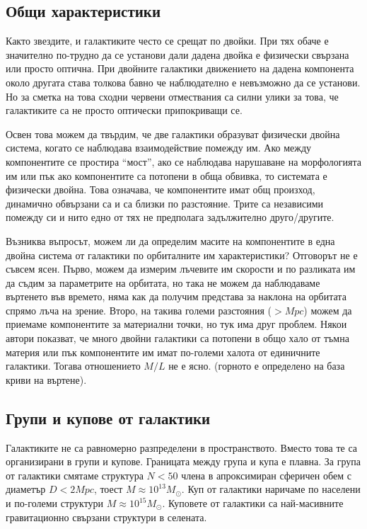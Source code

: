 \documentclass[a4paper,12pt]{article}
\begin{document}
\subsection{Общи характеристики}

 Както звездите, и галактиките често се срещат по двойки. При тях обаче е значително по-трудно да се установи дали дадена двойка е физически свързана или просто оптична. При двойните галактики движението на дадена компонента около другата става толкова бавно че наблюдателно е невъзможно да се установи. Но за сметка на това сходни червени отмествания са силни улики за това, че галактиките са не просто оптически припокриващи се.

 Освен това можем да твърдим, че две галактики образуват физически двойна система, когато се наблюдава взаимодействие помежду им. Ако между компонентите се простира ``мост'', ако се наблюдава нарушаване на морфологията им или пък ако компонентите са потопени в обща обвивка, то системата е физически двойна. Това означава, че компонентите имат общ произход, динамично обвързани са и са близки по разстояние. Трите са независими помежду си и нито едно от тях не предполага задължително друго/другите.

 Възниква въпросът, можем ли да определим масите на компонентите в една двойна система от галактики по орбиталните им характеристики? Отговорът не е съвсем ясен. Първо, можем да измерим лъчевите им скорости и по разликата им да съдим за параметрите на орбитата, но така не можем да наблюдаваме въртенето във времето, няма как да получим представа за наклона на орбитата спрямо лъча на зрение. Второ, на такива големи разстояния ($>Mpc$) можем да приемаме компонентите за материални точки, но тук има друг проблем. Някои автори показват, че много двойни галактики са потопени в общо хало от тъмна материя или пък компонентите им имат по-големи халота от единичните галактики. Тогава  отношението $M/L$ не е ясно. (горното е определено на база криви на въртене).

\subsection{Групи и купове от галактики}

 Галактиките не са равномерно разпределени в пространството. Вместо това те са организирани в групи и купове. Границата между група и купа е плавна. За група от галактики смятаме структура $N<50$ члена в апроксимиран сферичен обем с диаметър $D<2Mpc$, тоест $M \approx 10^{13} M_{\odot}$. Куп от галактики наричаме по населени и по-големи структури  $M \approx 10^{15} M_{\odot}$. Куповете от галактики са най-масивните гравитационно свързани структури в селената.\\
 
\end{document}
